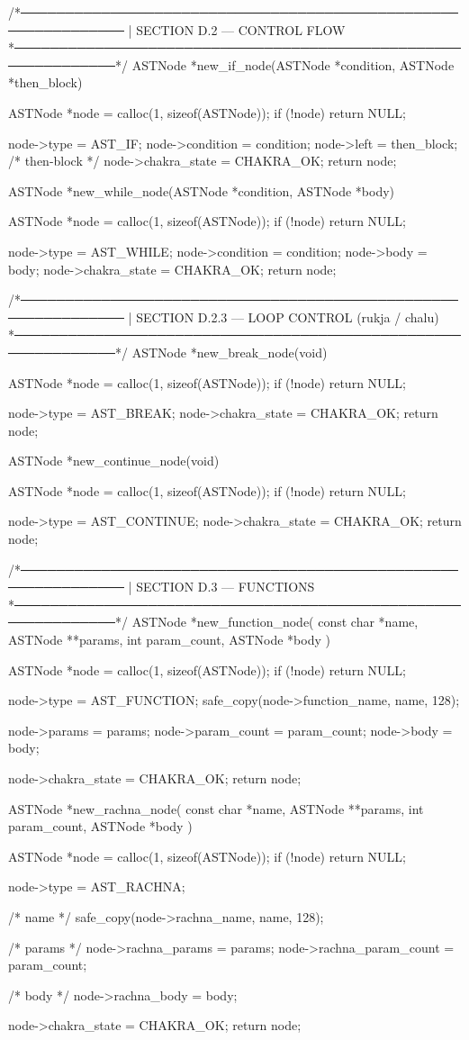 \documentclass{article}
\begin{document}
/*──────────────────────────────────────────────────────────────
 | SECTION D.2 — CONTROL FLOW
 *──────────────────────────────────────────────────────────────*/
ASTNode *new_if_node(ASTNode *condition, ASTNode *then_block)
{
    ASTNode *node = calloc(1, sizeof(ASTNode));
    if (!node) return NULL;

    node->type = AST_IF;
    node->condition = condition;
    node->left = then_block;     /* then-block */
    node->chakra_state = CHAKRA_OK;
    return node;
}

ASTNode *new_while_node(ASTNode *condition, ASTNode *body)
{
    ASTNode *node = calloc(1, sizeof(ASTNode));
    if (!node) return NULL;

    node->type = AST_WHILE;
    node->condition = condition;
    node->body = body;
    node->chakra_state = CHAKRA_OK;
    return node;
}

/*──────────────────────────────────────────────────────────────
 | SECTION D.2.3 — LOOP CONTROL (rukja / chalu)
 *──────────────────────────────────────────────────────────────*/
ASTNode *new_break_node(void)
{
    ASTNode *node = calloc(1, sizeof(ASTNode));
    if (!node) return NULL;

    node->type = AST_BREAK;
    node->chakra_state = CHAKRA_OK;
    return node;
}

ASTNode *new_continue_node(void)
{
    ASTNode *node = calloc(1, sizeof(ASTNode));
    if (!node) return NULL;

    node->type = AST_CONTINUE;
    node->chakra_state = CHAKRA_OK;
    return node;
}

/*──────────────────────────────────────────────────────────────
 | SECTION D.3 — FUNCTIONS
 *──────────────────────────────────────────────────────────────*/
ASTNode *new_function_node(
    const char *name,
    ASTNode **params,
    int param_count,
    ASTNode *body
) {
    ASTNode *node = calloc(1, sizeof(ASTNode));
    if (!node) return NULL;

    node->type = AST_FUNCTION;
    safe_copy(node->function_name, name, 128);

    node->params = params;
    node->param_count = param_count;
    node->body = body;

    node->chakra_state = CHAKRA_OK;
    return node;
}

ASTNode *new_rachna_node(
    const char *name,
    ASTNode **params,
    int param_count,
    ASTNode *body
)
{
    ASTNode *node = calloc(1, sizeof(ASTNode));
    if (!node) return NULL;

    node->type = AST_RACHNA;

    /* name */
    safe_copy(node->rachna_name, name, 128);

    /* params */
    node->rachna_params = params;
    node->rachna_param_count = param_count;

    /* body */
    node->rachna_body = body;

    node->chakra_state = CHAKRA_OK;
    return node;
}
\end{document}
